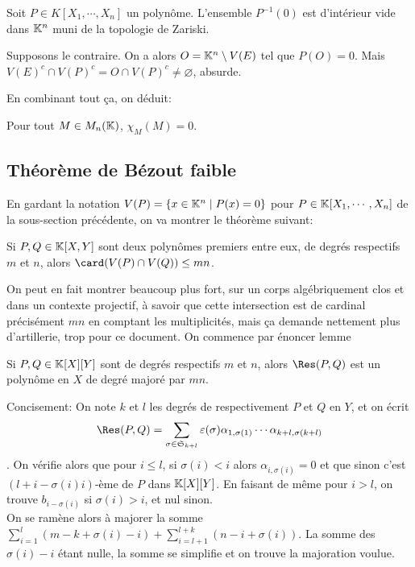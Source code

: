 \documentclass{article}
\begin{document}
\begin{proposition}
    Soit $P \in K[X_1, \cdots, X_n]$ un polynôme. L'ensemble $P^{-1}(0)$ est d'intérieur vide dans $\mathbb{K}^n$ muni de la topologie de Zariski.
\end{proposition}

\begin{preuve}
    Supposons le contraire. On a alors $O = \mathbb{K}^n \setminus V(E)$ tel que $P(O) = 0$. Mais $V(E)^c \cap V(P)^c = O \cap V(P)^c \neq \varnothing$, absurde.
\end{preuve}

En combinant tout ça, on déduit:

\begin{theoreme}
    Pour tout $M \in M_n(\mathbb{K})$, $\chi_M(M) = 0$.
\end{theoreme}
\newpage
\subsection{Théorème de Bézout faible}
En gardant la notation $V(P) = \{x \in \mathbb{K}^n \mid P(x) = 0\}$ pour $P \in \mathbb{K}[X_1, \cdots, X_n]$ de la sous-section précédente, on va montrer le théorème suivant:
\begin{theoreme}
    Si $P, Q \in \mathbb{K}[X, Y]$ sont deux polynômes premiers entre eux, de degrés respectifs $m$ et $n$, alors $\card(V(P) \cap V(Q)) \leq mn$.
\end{theoreme}
On peut en fait montrer beaucoup plus fort, sur un corps algébriquement clos et dans un contexte projectif, à savoir que cette intersection est de cardinal précisément $mn$ en comptant les multiplicités, mais ça demande nettement plus d'artillerie, trop pour ce document.
On commence par énoncer lemme

\begin{lemme}
    Si $P, Q \in \mathbb{K}[X][Y]$ sont de degrés respectifs $m$ et $n$, alors $\Res(P, Q)$ est un polynôme en $X$ de degré majoré par $mn$.
\end{lemme}

\begin{preuve}
    Concisement:
    On note $k$ et $l$ les degrés de respectivement $P$ et $Q$ en $Y$, et on écrit $$\Res(P, Q) = \sum_{\sigma \in \mathfrak{S}_{k+l}}{\varepsilon(\sigma)\alpha_{1,\sigma(1)} \cdots \alpha_{k+l, \sigma(k+l)}}$$.
    On vérifie alors que pour $i \leq l$, si $\sigma(i) < i$ alors $\alpha_{i, \sigma(i)} = 0$ et que sinon c'est $(l + i - \sigma(i)i)$-ème de $P$ dans $\mathbb{K}[X][Y]$. En faisant de même pour $i > l$, on trouve $b_{i-\sigma(i)}$ si $\sigma(i) > i$, et nul sinon.\\
    On se ramène alors à majorer la somme $\sum_{i=1}^{l}{(m-k + \sigma(i) - i)} + \sum_{i=l+1}^{l+k}{(n-i+\sigma(i))}$. La somme des $\sigma(i) - i$ étant nulle, la somme se simplifie et on trouve la majoration voulue.\\
\end{preuve}
\end{document}
